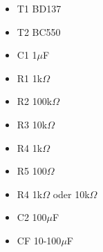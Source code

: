 \documentclass[12pt,a4paper]{article}
\begin{document}
\begin{itemize}
\item	T1 BD137

\item	T2 BC550

\item	C1 1$\mu$F

\item	R1 1k$\Omega$

\item	R2 100k$\Omega$

\item	R3 10k$\Omega$

\item	R4 1k$\Omega$

\item	R5 100$\Omega$

\item	R4 1k$\Omega$ oder 10k$\Omega$

\item	C2 100$\mu$F

\item	CF 10-100$\mu$F
\end{itemize}
\end{document}
